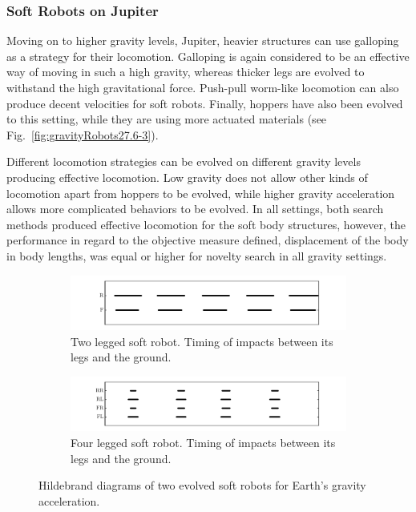 \documentclass{sig-alternate}
\begin{document}
\subsubsection*{Soft Robots on Jupiter}

Moving on to higher gravity levels, Jupiter, heavier structures can use galloping as a strategy for their locomotion. Galloping is again considered to be an effective way of moving in such a high gravity, whereas thicker legs are evolved to withstand the high gravitational force. Push-pull worm-like locomotion can also produce decent velocities for soft robots. Finally, hoppers have also been evolved to this setting, while they are using more actuated materials (see Fig.~\ref{fig:gravityRobots27.6-3}).


Different locomotion strategies can be evolved on different gravity levels producing effective locomotion. Low gravity does not allow other kinds of locomotion apart from hoppers to be evolved, while higher gravity acceleration allows more complicated behaviors to be evolved. In all settings, both search methods produced effective locomotion for the soft body structures, however, the performance in regard to the objective measure defined, displacement of the body in body lengths, was equal or higher for novelty search in all gravity settings.

\begin{figure}[t!]
\centering
\vspace{-0.13cm}
\begin{subfigure}[b]{0.5\textwidth}
\centering
\includegraphics[width=1.0\textwidth]{../Figures/Results/hildebrand1.pdf}
\caption{Two legged soft robot. Timing of impacts between its legs and the ground.}
\end{subfigure}
\vspace{-0.13cm}
\begin{subfigure}[b]{0.5\textwidth}
\centering
\includegraphics[width=1.0\textwidth]{../Figures/Results/hildebrand2.pdf}
\caption{Four legged soft robot. Timing of impacts between its legs and the ground.}
\end{subfigure}
\vspace{-0.13cm}
\caption{Hildebrand diagrams of two evolved soft robots for Earth's gravity acceleration.}
\label{fig:hildebrand}
\vspace{-15pt}
\end{figure}
\end{document}
